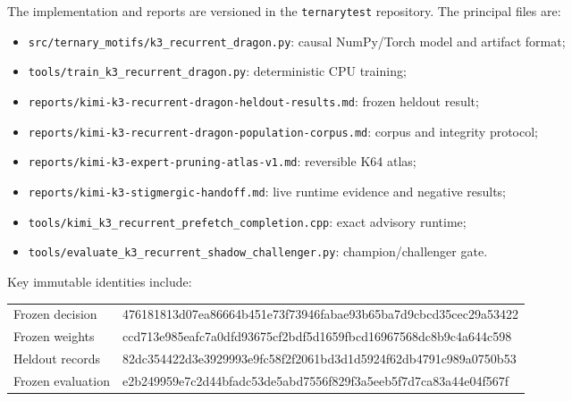 \documentclass[11pt]{article}
\begin{document}
The implementation and reports are versioned in the \texttt{ternarytest} repository. The principal files are:
\begin{itemize}
  \item \texttt{src/ternary\_motifs/k3\_recurrent\_dragon.py}: causal NumPy/Torch model and artifact format;
  \item \texttt{tools/train\_k3\_recurrent\_dragon.py}: deterministic CPU training;
  \item \texttt{reports/kimi-k3-recurrent-dragon-heldout-results.md}: frozen heldout result;
  \item \texttt{reports/kimi-k3-recurrent-dragon-population-corpus.md}: corpus and integrity protocol;
  \item \texttt{reports/kimi-k3-expert-pruning-atlas-v1.md}: reversible K64 atlas;
  \item \texttt{reports/kimi-k3-stigmergic-handoff.md}: live runtime evidence and negative results;
  \item \texttt{tools/kimi\_k3\_recurrent\_prefetch\_completion.cpp}: exact advisory runtime;
  \item \texttt{tools/evaluate\_k3\_recurrent\_shadow\_challenger.py}: champion/challenger gate.
\end{itemize}

Key immutable identities include:
\begin{center}
\scriptsize
\renewcommand{\arraystretch}{1.15}
\begin{tabularx}{\textwidth}{>{\raggedright\arraybackslash}p{3.3cm}>{\ttfamily\raggedright\arraybackslash}X}
Frozen decision & 476181813d07ea86664b451e73f73946fabae93b65ba7d9cbcd35cec29a53422 \\
Frozen weights & ccd713e985eafc7a0dfd93675cf2bdf5d1659fbcd16967568dc8b9c4a644c598 \\
Heldout records & 82dc354422d3e3929993e9fc58f2f2061bd3d1d5924f62db4791c989a0750b53 \\
Frozen evaluation & e2b249959e7c2d44bfadc53de5abd7556f829f3a5eeb5f7d7ca83a44e04f567f \\
\end{tabularx}
\end{center}
\end{document}
